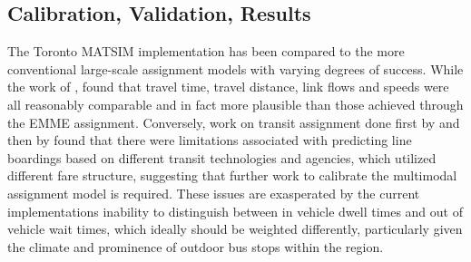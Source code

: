 \subsection{Calibration, Validation, Results}
The Toronto MATSIM implementation has been compared to the more conventional large-scale assignment models with varying degrees of success. While the work of \citet[][]{GaoWEtAl_TRR_2010}, found that travel time, travel distance, link flows and speeds were all reasonably comparable and in fact more plausible than those achieved through the EMME assignment. Conversely, work on transit assignment done first by \citet[][]{Kucirek_MastersThesis_2012} and then by \citet[][]{WeissEtAl_CJCE_2012} found that there were limitations associated with predicting line boardings based on different transit technologies and agencies, which utilized different fare structure, suggesting that further work to calibrate the multimodal assignment model is required. These issues are exasperated by the current implementations inability to distinguish between in vehicle dwell times and out of vehicle wait times, which ideally should be weighted differently, particularly given the climate and prominence of outdoor bus stops within the region. 


